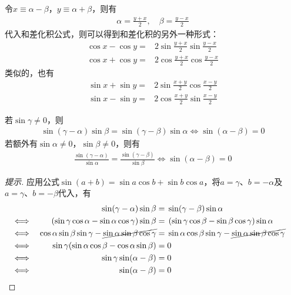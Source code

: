 \begin{example}
  令$x \equiv \alpha - \beta$，$y\equiv \alpha + \beta$，则有
  \begin{align*}
    \alpha = \frac{y+x}{2},\quad \beta = \frac{y-x}{2}
  \end{align*}
  代入和差化积公式，则可以得到和差化积的另外一种形式：
  \begin{align*}
    \cos x - \cos y ={}& 2 \sin\frac{y+x}{2} \sin\frac{y-x}{2}\\[5pt]
    \cos x + \cos y ={}& 2 \cos\frac{y+x}{2} \cos\frac{y-x}{2}
  \end{align*}
  类似的，也有
  \begin{align*}
    \sin x + \sin y ={}& 2 \sin\frac{x+y}{2}\cos\frac{x-y}{2}\\[5pt]
    \sin x - \sin y ={}& 2 \cos\frac{x+y}{2}\sin\frac{x-y}{2}
  \end{align*}
\end{example}

\begin{example}\label{ex:sin(alpha-beta)=0}
  若$\sin\gamma\ne0$，则
  \begin{align*}
    \sin(\gamma-\alpha)\sin\beta = \sin(\gamma-\beta)\sin\alpha \iff
    \sin(\alpha - \beta) = 0
  \end{align*}
  若额外有$\sin\alpha\ne 0$，$\sin\beta\ne 0$，则有
  \begin{align*}
    \frac{\sin(\gamma-\alpha)}{\sin\alpha} = \frac{\sin(\gamma-\beta)}{\sin\beta} \iff
    \sin(\alpha - \beta) = 0
  \end{align*}
\end{example}
\begin{proof}[提示]
  应用公式$\sin(a + b) = \sin a \cos b + \sin b \cos a$，将$a= \gamma$、$b=-\alpha$及$a=\gamma$、$b=-\beta$代入，有
  \begin{align*}
    &&\sin(\gamma-\alpha)\sin\beta ={}& \sin(\gamma-\beta)\sin\alpha \\
    \iff &&
           \left(\sin\gamma\cos\alpha - \sin\alpha\cos\gamma\right) \sin\beta ={}& 
           \left(\sin\gamma\cos\beta -  \sin\beta \cos\gamma\right) \sin\alpha\\
    \iff&&
          \cos\alpha\sin\beta\sin\gamma - \cancel{\sin\alpha\sin\beta\cos\gamma}={}&
          \sin\alpha\cos\beta\sin\gamma - \cancel{\sin\alpha\sin\beta\cos\gamma}\\
    \iff&& \sin\gamma(\sin\alpha\cos\beta - \cos\alpha\sin\beta) ={}& 0\\
    \iff&& \sin\gamma\sin(\alpha-\beta) ={}& 0\\
    \iff&& \sin(\alpha - \beta) ={}& 0 & \qedhere
  \end{align*}
\end{proof}

